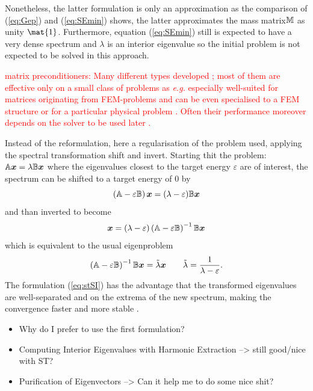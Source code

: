 Nonetheless, the latter formulation is only an approximation as the comparison of (\ref{eq:Gep}) and (\ref{eq:SEmin}) shows, the latter approximates the mass matrix$\mathbb{M}$ as unity $\mat{1}$.
Furthermore, equation (\ref{eq:SEmin}) still is expected to have a very dense spectrum and $\lambda$ is an interior eigenvalue so the initial problem is not expected to be solved in this approach.

\textcolor{red}{matrix preconditioners: Many different types developed \cite{Helmke2010}; most of them are effective only on a small class of problems as \textit{e.g.} especially well-suited for matrices originating from FEM-problems \cite{PrecFem, PrecFem2} and can be even specialised to a FEM structure \cite{MultPrec,MultPrec2} or for a particular physical problem \cite{HelmhPrec}. Often their performance moreover depends on the solver to be used later \cite{PrecKr}.}

Instead of the reformulation, here a regularisation of the problem used, applying the spectral transformation shift and invert.
Starting thit the problem: $\mathbb{A}\bm{x}=\lambda\mathbb{B}\bm{x}$ where the eigenvalues closest to the target energy $\varepsilon$ are of interest, the spectrum can be shifted to a target energy of $0$ by
\begin{equation}
\left(\mathbb{A}-\varepsilon\mathbb{B}\right)\bm{x}=(\lambda-\varepsilon)\mathbb{B}\bm{x}
\end{equation}
and than inverted to become
\begin{equation}
\bm{x}=(\lambda-\varepsilon)\left(\mathbb{A}-\varepsilon\mathbb{B}\right)^{-1}\mathbb{B}\bm{x}
\end{equation}
which is equivalent to the usual eigenproblem
\begin{equation} \label{eq:stSI}
\left(\mathbb{A}-\varepsilon\mathbb{B}\right)^{-1}\mathbb{B}\bm{x}=\tilde\lambda \bm{x} \qquad \tilde\lambda=\frac{1}{\lambda-\varepsilon}.
\end{equation}
The formulation (\ref{eq:stSI}) has the advantage that the transformed eigenvalues are well-separated and on the extrema of the new spectrum, making the convergence faster and more stable \cite{str-7}.
\begin{itemize}
\item Why do I prefer to use the first formulation?
\item Computing Interior Eigenvalues with Harmonic Extraction --> still good/nice with ST?
\item Purification of Eigenvectors --> Can it help me to do some nice shit?
\end{itemize}

